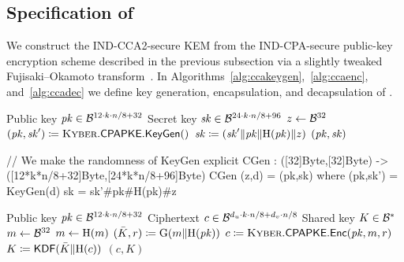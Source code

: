 \clearpage

\subsection{Specification of \KyberCCAKEM}
\label{subsec:specification:ccakem}

We construct the \KyberCCAKEM IND-CCA2-secure KEM from the IND-CPA-secure
public-key encryption scheme described in the previous subsection via a slightly
tweaked Fujisaki--Okamoto transform~\cite{C:FujOka99}. 
In Algorithms~\ref{alg:ccakeygen},~\ref{alg:ccaenc}, and~\ref{alg:ccadec}
we define key generation, encapsulation, and decapsulation of \KyberCCAKEM.

\begin{algorithm}
  \caption{$\KyberCCAKEM.\KEMGen()$
  \label{alg:ccakeygen}}
  \begin{algorithmic}[1]
    \Ensure Public key $\mathit{pk} \in \mathcal{B}^{12\cdot k\cdot n/8 + 32}$
    \Ensure Secret key $\mathit{sk} \in \mathcal{B}^{24\cdot k\cdot n/8 + 96}$
    \State $z \gets \mathcal{B}^{32}$
    \State $(\mathit{pk},\mathit{sk}') \coloneqq \text{{\sc Kyber}}.{\sf CPAPKE}.\mathsf{KeyGen}()$
    \State $\mathit{sk} \coloneqq (\mathit{sk}'\Vert \mathit{pk}\Vert \text{H}(\mathit{pk})\Vert z)$
    \State \Return $(\mathit{pk}, \mathit{sk})$
  \end{algorithmic}
\end{algorithm}

\begin{code}
  // We make the randomness of KeyGen explicit
  CGen : ([32]Byte,[32]Byte) -> ([12*k*n/8+32]Byte,[24*k*n/8+96]Byte)
  CGen (z,d) = (pk,sk) where
    (pk,sk') = KeyGen(d)
    sk = sk'#pk#H(pk)#z
\end{code}

\begin{algorithm}
  \caption{$\KyberCCAKEM.\KEMEnc(\pk)$
  \label{alg:ccaenc}}
  \begin{algorithmic}[1]
    \Require Public key $\mathit{pk} \in \mathcal{B}^{12\cdot k\cdot n/8 + 32}$
    \Ensure Ciphertext $c \in \mathcal{B}^{d_u\cdot k\cdot n/8 + d_v\cdot n/8}$
    \Ensure Shared key $K \in \mathcal{B}^*$
    \State $m\gets \mathcal{B}^{32}$\label{line:ccaenc:m}
    \State $m\gets \text{H}(m)$
    \State $(\bar{K},r) \coloneqq \text{G}(m\Vert \text{H}(\mathit{pk}))$\label{line:ccaenc:r}
    \State $c \coloneqq \text{{\sc Kyber}}.{\sf CPAPKE}.\mathsf{Enc}(\mathit{pk}, m, r)$
    \State $K \coloneqq \mathsf{KDF}(\bar{K}\Vert \text{H}(c))$\label{line:ccaenc:k}
    \State \Return $(c, K)$
  \end{algorithmic}
\end{algorithm}

